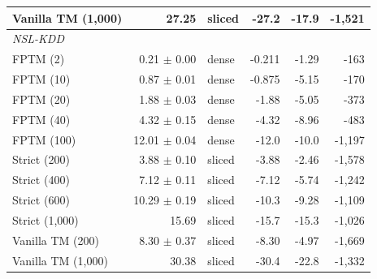 \begin{tabular}{lrlrrr}
Vanilla TM (1,000) & 27.25 & sliced & \hyp{27.2} & \hyp{17.9} & \hyp{1,521} \\
\midrule
\multicolumn{6}{l}{\textit{NSL-KDD}} \\
FPTM (2) & 0.21 $\pm$ 0.00 & dense & \hyp{0.211} & \hyp{1.29} & \hyp{163} \\
FPTM (10) & 0.87 $\pm$ 0.01 & dense & \hyp{0.875} & \hyp{5.15} & \hyp{170} \\
FPTM (20) & 1.88 $\pm$ 0.03 & dense & \hyp{1.88} & \hyp{5.05} & \hyp{373} \\
FPTM (40) & 4.32 $\pm$ 0.15 & dense & \hyp{4.32} & \hyp{8.96} & \hyp{483} \\
FPTM (100) & 12.01 $\pm$ 0.04 & dense & \hyp{12.0} & \hyp{10.0} & \hyp{1,197} \\
Strict (200) & 3.88 $\pm$ 0.10 & sliced & \hyp{3.88} & \hyp{2.46} & \hyp{1,578} \\
Strict (400) & 7.12 $\pm$ 0.11 & sliced & \hyp{7.12} & \hyp{5.74} & \hyp{1,242} \\
Strict (600) & 10.29 $\pm$ 0.19 & sliced & \hyp{10.3} & \hyp{9.28} & \hyp{1,109} \\
Strict (1,000) & 15.69 & sliced & \hyp{15.7} & \hyp{15.3} & \hyp{1,026} \\
Vanilla TM (200) & 8.30 $\pm$ 0.37 & sliced & \hyp{8.30} & \hyp{4.97} & \hyp{1,669} \\
Vanilla TM (1,000) & 30.38 & sliced & \hyp{30.4} & \hyp{22.8} & \hyp{1,332} \\
\bottomrule
\end{tabular}
